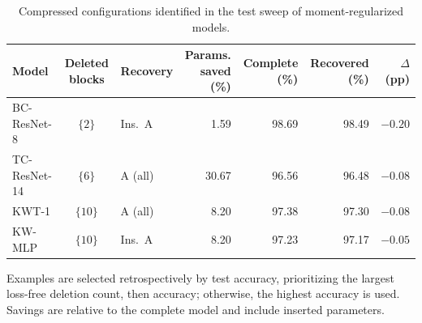 \begin{table}[htbp]
\caption{Compressed configurations identified in the test sweep of moment-regularized models.}
\label{tab:regularized_examples}
\centering\small
\setlength{\tabcolsep}{3pt}
\begin{tabular*}{\linewidth}{@{\extracolsep{\fill}}lclrrrr@{}}
\toprule
Model & Deleted blocks & Recovery & \shortstack{Params.\\saved (\%)} & Complete (\%) & Recovered (\%) & $\Delta$ (pp) \\
\midrule
BC-ResNet-8 & $\{2\}$ & Ins.\ A & 1.59 & 98.69 & 98.49 & $-0.20$ \\
TC-ResNet-14 & $\{6\}$ & A (all) & 30.67 & 96.56 & 96.48 & $-0.08$ \\
KWT-1 & $\{10\}$ & A (all) & 8.20 & 97.38 & 97.30 & $-0.08$ \\
KW-MLP & $\{10\}$ & Ins.\ A & 8.20 & 97.23 & 97.17 & $-0.05$ \\
\bottomrule
\end{tabular*}
\par\smallskip\begin{minipage}{\linewidth}\footnotesize
Examples are selected retrospectively by test accuracy, prioritizing the largest loss-free deletion count, then accuracy; otherwise, the highest accuracy is used. Savings are relative to the complete model and include inserted parameters.
\end{minipage}
\end{table}
